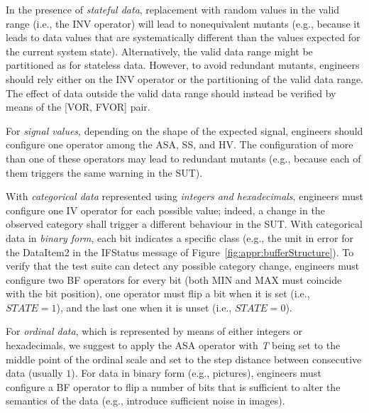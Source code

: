 In the presence of \emph{stateful data}, replacement with random values in the valid range (i.e., the INV operator) will lead to nonequivalent mutants (e.g., because it leads to data values that are systematically different than the values expected for the current system state). Alternatively, the valid data range might be partitioned as for stateless data. However, to avoid redundant mutants, engineers should rely either on the INV operator or the partitioning of the valid data range. 
The effect of data outside the valid data range should instead be verified by means of the [VOR, FVOR] pair.

For \emph{signal values}, depending on the shape of the expected signal, engineers should configure one operator among the ASA, SS, and HV. The configuration of more than one of these operators may lead to redundant mutants (e.g., because each of them triggers the same warning in the SUT).

With \emph{categorical data} represented using \emph{integers and hexadecimals}, engineers must configure one IV operator for each possible value; indeed, a change in the observed category shall trigger a different behaviour in the SUT. 
With categorical data in \emph{binary form}, each bit indicates a specific class (e.g., the unit in error for the DataItem2 in the IFStatus message of Figure~\ref{fig:appr:bufferStructure}).  
To verify that the test suite can detect any possible category change, engineers must configure two BF operators for every bit (both MIN and MAX must coincide with the bit position), one operator must flip a bit when it is set (i.e., $\mathit{STATE}=1$), and the last one when it is unset (i.e., $\mathit{STATE}=0$). 

For \emph{ordinal data}, which is represented by means of either integers or hexadecimals, we suggest to apply the ASA operator with \emph{T} being set to the middle point of the ordinal scale and \D set to the step distance between consecutive data (usually $1$). For data in binary form (e.g., pictures), engineers must configure a BF operator to flip a number of bits  that is sufficient to alter the semantics of the data (e.g., introduce sufficient noise in images).

